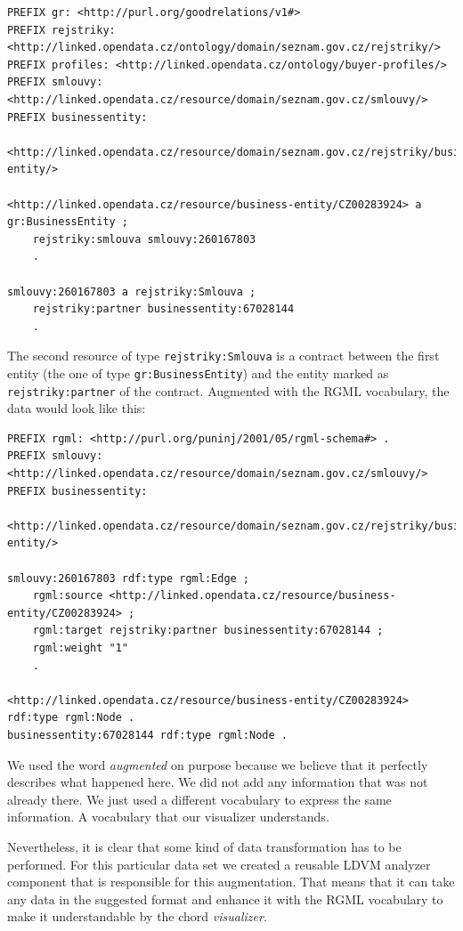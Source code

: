 \begin{verbatim}
PREFIX gr: <http://purl.org/goodrelations/v1#>
PREFIX rejstriky: <http://linked.opendata.cz/ontology/domain/seznam.gov.cz/rejstriky/>
PREFIX profiles: <http://linked.opendata.cz/ontology/buyer-profiles/>
PREFIX smlouvy: <http://linked.opendata.cz/resource/domain/seznam.gov.cz/smlouvy/>
PREFIX businessentity: 
    <http://linked.opendata.cz/resource/domain/seznam.gov.cz/rejstriky/business-entity/>

<http://linked.opendata.cz/resource/business-entity/CZ00283924> a gr:BusinessEntity ;
    rejstriky:smlouva smlouvy:260167803 
    .
        
smlouvy:260167803 a rejstriky:Smlouva ;
    rejstriky:partner businessentity:67028144 
    .
\end{verbatim}

The second resource of type \texttt{rejstriky:Smlouva} is a contract between the first entity (the one of type \texttt{gr:BusinessEntity}) and the entity marked as \texttt{rejstriky:partner} of the contract. Augmented with the RGML vocabulary, the data would look like this:

\begin{verbatim}
PREFIX rgml: <http://purl.org/puninj/2001/05/rgml-schema#> .
PREFIX smlouvy: <http://linked.opendata.cz/resource/domain/seznam.gov.cz/smlouvy/>
PREFIX businessentity: 
    <http://linked.opendata.cz/resource/domain/seznam.gov.cz/rejstriky/business-entity/>

smlouvy:260167803 rdf:type rgml:Edge ;
    rgml:source <http://linked.opendata.cz/resource/business-entity/CZ00283924> ;
    rgml:target rejstriky:partner businessentity:67028144 ;
    rgml:weight "1" 
    .
    
<http://linked.opendata.cz/resource/business-entity/CZ00283924> rdf:type rgml:Node .
businessentity:67028144 rdf:type rgml:Node . 
\end{verbatim}

We used the word \emph{augmented} on purpose because we believe that it perfectly describes what happened here. We did not add any information that was not already there. We just used a different vocabulary to express the same information. A vocabulary that our visualizer understands.

Nevertheless, it is clear that some kind of data transformation has to be performed. For this particular data set we created a reusable LDVM analyzer component that is responsible for this augmentation. That means that it can take any data in the suggested format and enhance it with the RGML vocabulary to make it understandable by the chord \emph{visualizer}.


